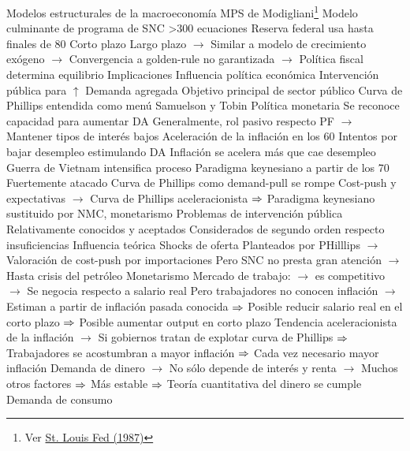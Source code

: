 \documentclass{nuevotema}
\begin{document}
\begin{esquemal}
			\3 Modelos estructurales de la macroeconomía
				\4 MPS de Modigliani\footnote{Ver \href{https://fraser.stlouisfed.org/files/docs/publications/FRB/pages/1985-1989/32204_1985-1989.pdf}{St. Louis Fed (1987)}}
				\4[] Modelo culminante de programa de SNC
				\4[] >300 ecuaciones
				\4[] Reserva federal usa hasta finales de 80
				\4[] Corto plazo
				\4[] Largo plazo
				\4[] $\to$ Similar a modelo de crecimiento exógeno
				\4[] $\to$ Convergencia a golden-rule no garantizada
				\4[] $\to$ Política fiscal determina equilibrio
		\2 Implicaciones
			\3 Influencia política económica
				\4 Intervención pública para $\uparrow$ Demanda agregada
				\4[] Objetivo principal de sector público
				\4 Curva de Phillips entendida como menú
				\4[] Samuelson y Tobin
				\4 Política monetaria
				\4[] Se reconoce capacidad para aumentar DA
				\4[] Generalmente, rol pasivo respecto PF
				\4[] $\to$ Mantener tipos de interés bajos
				\4 Aceleración de la inflación en los 60
				\4[] Intentos por bajar desempleo estimulando DA
				\4[] Inflación se acelera más que cae desempleo
				\4[] Guerra de Vietnam intensifica proceso
				\4 Paradigma keynesiano a partir de los 70
				\4[] Fuertemente atacado
				\4[] Curva de Phillips como demand-pull se rompe
				\4[] Cost-push y expectativas
				\4[] $\to$ Curva de Phillips aceleracionista
				\4[] $\Rightarrow$ Paradigma keynesiano sustituido por NMC, monetarismo
				\4 Problemas de intervención pública
				\4[] Relativamente conocidos y aceptados
				\4[] Considerados de segundo orden respecto insuficiencias
			\3 Influencia teórica
				\4 Shocks de oferta
				\4[] Planteados por PHilllips
				\4[] $\to$ Valoración de cost-push por importaciones
				\4[] Pero SNC no presta gran atención
				\4[] $\to$ Hasta crisis del petróleo
				\4 Monetarismo
				\4[] Mercado de trabajo:
				\4[] $\to$ es competitivo
				\4[] $\to$ Se negocia respecto a salario real
				\4[] Pero trabajadores no conocen inflación
				\4[] $\to$ Estiman a partir de inflación pasada conocida
				\4[] $\Rightarrow$ Posible reducir salario real en el corto plazo
				\4[] $\Rightarrow$ Posible aumentar output en corto plazo
				\4[] Tendencia aceleracionista de la inflación
				\4[] $\to$ Si gobiernos tratan de explotar curva de Phillips
				\4[] $\Rightarrow$ Trabajadores se acostumbran a mayor inflación
				\4[] $\Rightarrow$ Cada vez necesario mayor inflación
				\4[] Demanda de dinero
				\4[] $\to$ No sólo depende de interés y renta
				\4[] $\to$ Muchos otros factores
				\4[] $\Rightarrow$ Más estable
				\4[] $\Rightarrow$ Teoría cuantitativa del dinero se cumple
				\4[] Demanda de consumo

\end{esquemal}
\end{document}
